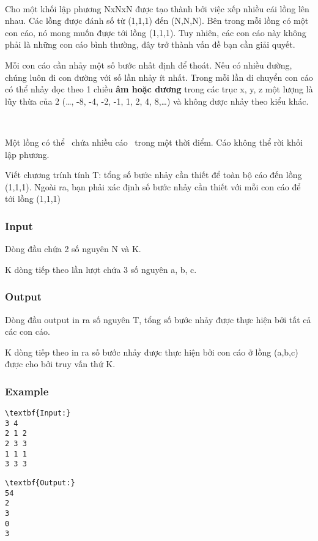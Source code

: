 

 

Cho một khối lập phương NxNxN được tạo thành bởi việc xếp nhiều cái lồng lên nhau. Các lồng được đánh số từ (1,1,1) đến (N,N,N). Bên trong mỗi lồng có một con cáo, nó mong muốn được tới lồng (1,1,1). Tuy nhiên, các con cáo này không phải là những con cáo bình thường, đây trở thành vấn đề bạn cần giải quyết.

Mỗi con cáo cần nhảy một số bước nhất định để thoát. Nếu có nhiều đường, chúng luôn đi con đường với số lần nhảy ít nhất. Trong mỗi lần di chuyển con cáo có thể nhảy dọc theo 1 chiều \textbf{ âm hoặc dương } trong các trục x, y, z một lượng là lũy thừa của 2 (…, -8, -4, -2, -1, 1, 2, 4, 8,…) và không được nhảy theo kiểu khác.

 

Một lồng có thể  chứa nhiều cáo  trong một thời điểm. Cáo không thể rời khối lập phương.

Viết chương trính tính T: tổng số bước nhảy cần thiết để toàn bộ cáo đến lồng (1,1,1). Ngoài ra, bạn phải xác định số bước nhảy cần thiết với mỗi con cáo để tới lồng (1,1,1)

\subsubsection{Input}

Dòng đầu chứa 2 số nguyên N và K.

K dòng tiếp theo lần lượt chứa 3 số nguyên a, b, c.

\subsubsection{Output}

Dòng đầu output in ra số nguyên T, tổng số bước nhảy được thực hiện bởi tất cả các con cáo.

K dòng tiếp theo in ra số bước nhảy được thực hiện bởi con cáo ở lồng (a,b,c) được cho bởi truy vấn thứ K.

\subsubsection{Example}
\begin{verbatim}
\textbf{Input:}
3 4
2 1 2
2 3 3
1 1 1
3 3 3\end{verbatim}
\begin{verbatim}
\textbf{Output:}
54
2
3
0
3\end{verbatim}

